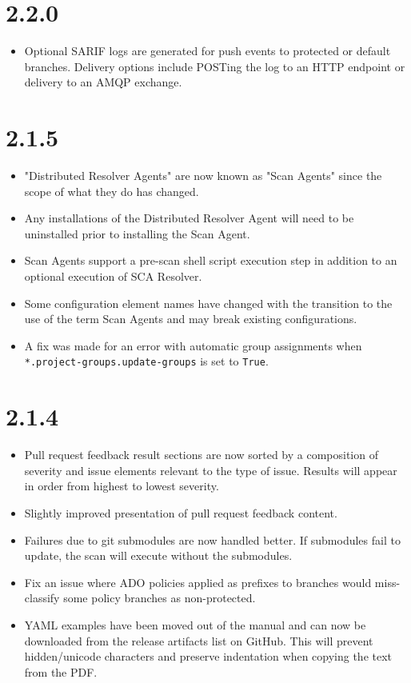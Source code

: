 \section{2.2.0}
\begin{itemize}
    \item Optional SARIF logs are generated for push events to protected or default branches.  Delivery options include POSTing
    the log to an HTTP endpoint or delivery to an AMQP exchange.
\end{itemize}

\section{2.1.5}

\begin{itemize}
    \item "Distributed Resolver Agents" are now known as "Scan Agents" since the scope of what they do has changed.
    \item Any installations of the Distributed Resolver Agent will need to be uninstalled prior to installing the Scan Agent.
    \item Scan Agents support a pre-scan shell script execution step in addition to an optional execution of SCA Resolver.
    \item Some configuration element names have changed with the transition to the use of the term Scan Agents and may break
    existing configurations.
    \item A fix was made for an error with automatic group assignments when \texttt{*.project-groups.update-groups} is set
    to \texttt{True}.
\end{itemize}

\section{2.1.4}

\begin{itemize}
    \item Pull request feedback result sections are now sorted by a composition of severity and issue elements
    relevant to the type of issue.  Results will appear in order from highest to lowest severity.
    \item Slightly improved presentation of pull request feedback content.
    \item Failures due to git submodules are now handled better.  If submodules fail to update, the scan will execute without
    the submodules.
    \item Fix an issue where ADO policies applied as prefixes to branches would miss-classify some policy branches as non-protected.
    \item YAML examples have been moved out of the manual and can now be downloaded from the release artifacts list on GitHub.  This
    will prevent hidden/unicode characters and preserve indentation when copying the text from the PDF.
\end{itemize}

